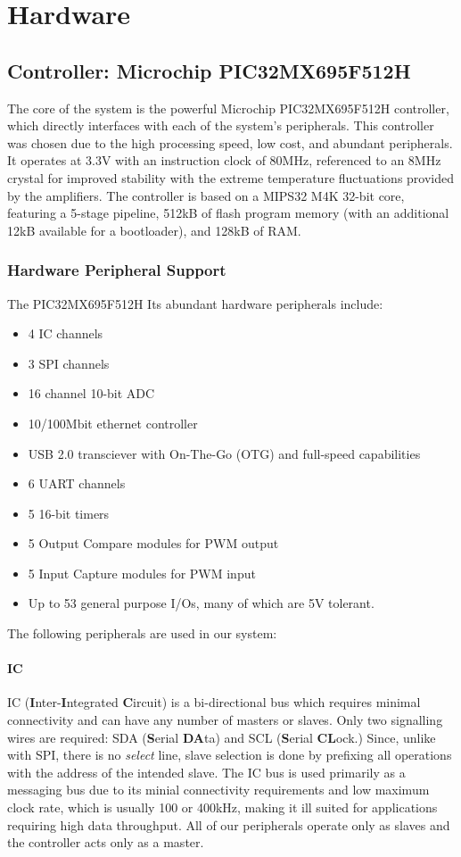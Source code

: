 \chapter{Hardware}

\section{Controller: Microchip PIC32MX695F512H}
The core of the system is the powerful Microchip PIC32MX695F512H controller, which directly interfaces with each of the system's peripherals. This controller was chosen due to the high processing speed, low cost, and abundant peripherals. It operates at 3.3V with an instruction clock of 80MHz, referenced to an 8MHz crystal for improved stability with the extreme temperature fluctuations provided by the amplifiers. The controller is based on a MIPS32 M4K 32-bit core, featuring a 5-stage pipeline, 512kB of flash program memory (with an additional 12kB available for a bootloader), and 128kB of RAM.
\subsection{Hardware Peripheral Support}
The PIC32MX695F512H Its abundant hardware peripherals include:
\begin{itemize}
\item 4 IC channels
\item 3 SPI channels
\item 16 channel 10-bit ADC
\item 10/100Mbit ethernet controller
\item USB 2.0 transciever with On-The-Go (OTG) and full-speed capabilities
\item 6 UART channels
\item 5 16-bit timers
\item 5 Output Compare modules for PWM output
\item 5 Input Capture modules for PWM input
\item Up to 53 general purpose I/Os, many of which are 5V tolerant. 
\end{itemize}

The following peripherals are used in our system:
\subsubsection*{IC}
IC (\textbf{I}nter-\textbf{I}ntegrated \textbf{C}ircuit) is a bi-directional bus which requires minimal connectivity and can have any number of masters or slaves. Only two signalling wires are required: SDA (\textbf{S}erial \textbf{DA}ta) and SCL (\textbf{S}erial \textbf{CL}ock.) Since, unlike with SPI, there is no \textit{select} line, slave selection is done by prefixing all operations with the address of the intended slave. The IC bus is used primarily as a messaging bus due to its minial connectivity requirements and low maximum clock rate, which is usually 100 or 400kHz, making it ill suited for applications requiring high data throughput. All of our peripherals operate only as slaves and the controller acts only as a master.
